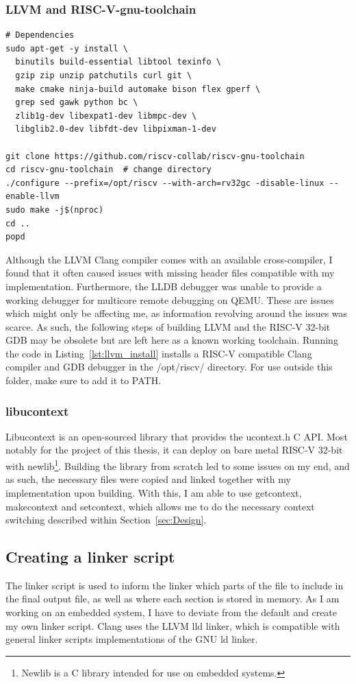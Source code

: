 \subsubsection*{LLVM and RISC-V-gnu-toolchain}
\begin{lstlisting}[caption=Installing LLVM compiler infastructure with RISC-V
32-bit as native target., label=lst:llvm_install, float=h]
# Dependencies
sudo apt-get -y install \
  binutils build-essential libtool texinfo \
  gzip zip unzip patchutils curl git \
  make cmake ninja-build automake bison flex gperf \
  grep sed gawk python bc \
  zlib1g-dev libexpat1-dev libmpc-dev \
  libglib2.0-dev libfdt-dev libpixman-1-dev

git clone https://github.com/riscv-collab/riscv-gnu-toolchain
cd riscv-gnu-toolchain  # change directory
./configure --prefix=/opt/riscv --with-arch=rv32gc -disable-linux --enable-llvm
sudo make -j$(nproc)
cd ..
popd
\end{lstlisting}
Although the LLVM Clang compiler comes with an available cross-compiler, I found
that it often caused issues with missing header files compatible with my
implementation. Furthermore, the LLDB debugger was unable to provide a working
debugger for multicore remote debugging on QEMU. These are issues which might
only be affecting me, as information revolving around the issues was scarce. As
such, the following steps of building LLVM and the RISC-V 32-bit GDB may be
obsolete but are left here as a known working toolchain. Running the code in
Listing~\ref{lst:llvm_install} installs a RISC-V compatible Clang compiler and
GDB debugger in the /opt/riscv/ directory. For use outside this folder, make
sure to add it to PATH.

\subsubsection*{libucontext}
Libucontext is an open-sourced library that provides the ucontext.h C API. Most
notably for the project of this thesis, it can deploy on bare metal RISC-V
32-bit with newlib\footnote{Newlib is a C library intended for use on embedded
systems.}. Building the library from scratch led to some issues on my end, and
as such, the necessary files were copied and linked together with my
implementation upon building. With this, I am able to use getcontext,
makecontext and setcontext, which allows me to do the necessary context
switching described within Section~\ref{sec:Design}.


\subsection{Creating a linker script}
The linker script is used to inform the linker which parts of the file to
include in the final output file, as well as where each section is stored in
memory. As I am working on an embedded system, I have to deviate from the
default and create my own linker script. Clang uses the LLVM lld linker, which
is compatible with general linker scripts implementations of the GNU ld
linker\cite{llvm-org-linker}.


